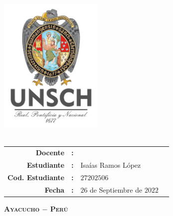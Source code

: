 \thispagestyle{empty}
\phantom{dy}
\begin{center}
	{\Large\scshape\bfseries \dyuniversity}\\
	\vspace{2.5mm}
	{\Large\scshape\bfseries \dyfaculty}\\
	\vspace{2.5mm}
	{\Large\scshape\bfseries \dydept}\\
	\vspace{8mm}
	\includegraphics[width=5cm]{Images/logo/logounsch_a.png}\\
	\vspace{2pt}
	{\Large\bfseries \dycourse}\\
	\vspace{2pt}
	\vspace{0.7cm}{\underline{\Large\bfseries\vphantom{dy}\dytitle}}
	\vspace{5pt}

	\boxabstractd{10cm}{\bfseries\large\centering \dytema}
	\vspace{1cm}
	\begin{center}
		\begin{tabular}{rcll}
			\toprule
			\bf Docente         & \bf: & \dyteacher{}                 & \\[5pt]
			\bf Estudiante      & \bf: & Isaías Ramos López           & \\[5pt]
			\bf Cod. Estudiante & \bf: & $27202506$                   & \\[5pt]
			\bf Fecha           & \bf: & $26$ de Septiembre de $2022$ & \\
			\bottomrule
		\end{tabular}
	\end{center}

	\vfill
	{\Large\scshape\bfseries Ayacucho $-$ Perú}\\
	\vspace{4mm} {\Large\bfseries\dycopyrightyear}
\end{center}

\cleardoublepage{}